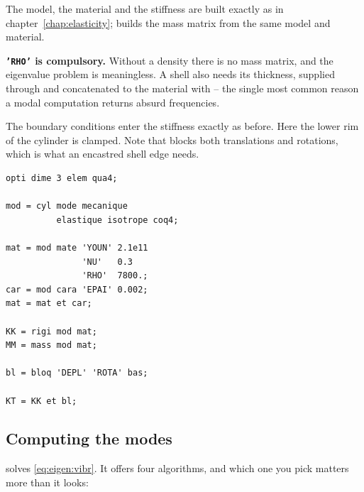 \begin{castemcom}
The model, the material and the stiffness are built exactly as in
chapter~\ref{chap:elasticity};  
builds the mass matrix from the same model and material.

%
\textbf{\texttt{'RHO'} is compulsory.} Without a density there is no mass
matrix, and the eigenvalue problem is meaningless. A shell also needs its
thickness, supplied through   and concatenated to the material with  -- the single
most common reason a modal computation returns absurd frequencies.

The boundary conditions enter the stiffness exactly as before. Here the lower
rim of the cylinder is clamped. Note that  blocks both
translations and rotations, which is what an encastred shell edge needs.
\end{castemcom}
\begin{castemlines}
\begin{verbatim}
opti dime 3 elem qua4;

mod = cyl mode mecanique
          elastique isotrope coq4;

mat = mod mate 'YOUN' 2.1e11
               'NU'   0.3
               'RHO'  7800.;
car = mod cara 'EPAI' 0.002;
mat = mat et car;

KK = rigi mod mat;
MM = mass mod mat;

bl = bloq 'DEPL' 'ROTA' bas;

KT = KK et bl;
\end{verbatim}
\end{castemlines}

\subsection{Computing the modes}

  solves
\eqref{eq:eigen:vibr}. It offers four algorithms, and which one you pick
matters more than it looks:

